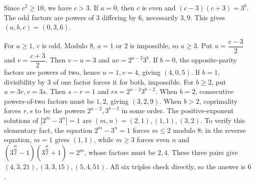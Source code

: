 Since $c^2\ge10$, we have $c>3$. If $a=0$, then $c$ is even and $(c-3)(c+3)=3^b$. The odd factors are powers of $3$ differing by $6$, necessarily $3,9$. This gives $(a,b,c)=(0,3,6)$.

For $a\ge1$, $c$ is odd. Modulo $8$, $a=1$ or $2$ is impossible, so $a\ge3$. Put $u=\dfrac{c-3}{2}$ and $v=\dfrac{c+3}{2}$. Then $v-u=3$ and $uv=2^{a-2}3^b$.
If $b=0$, the opposite-parity factors are powers of two, hence $u=1,v=4$, giving $(4,0,5)$. If $b=1$, divisibility by $3$ of one factor forces it for both, impossible. For $b\ge2$, put $u=3r,v=3s$. Then $s-r=1$ and $rs=2^{a-2}3^{b-2}$.
When $b=2$, consecutive powers-of-two factors must be $1,2$, giving $(3,2,9)$.
When $b>2$, coprimality forces $r,s$ to be the powers $2^{a-2},3^{b-2}$ in some order. The positive-exponent solutions of $|2^m-3^n|=1$ are $(m,n)=(2,1),(1,1),(3,2)$. To verify this elementary fact, the equation $2^m-3^n=1$ forces $m\le2$ modulo $8$; in the reverse equation, $m=1$ gives $(1,1)$, while $m\ge3$ forces even $n$ and $(3^{\dfrac{n}{2}}-1)(3^{\dfrac{n}{2}}+1)=2^m$, whose factors must be $2,4$.
These three pairs give $(4,3,21),(3,3,15),(5,4,51)$.
All six triples check directly, so the answer is $\boxed6$.
